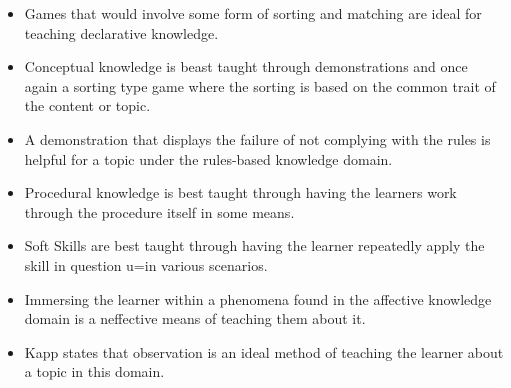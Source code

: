 \documentclass[conference]{IEEEtran}
\begin{document}
\begin{itemize}
\item
Games that would involve some form of sorting and matching are ideal for teaching declarative knowledge\cite{Kapp2012a}.
\item
Conceptual knowledge is beast taught through demonstrations and once again a sorting type game where the sorting is based on the common trait of the content or topic\cite{Kapp2012a}.
\item
A demonstration that displays the failure of not complying with the rules is helpful for a topic under the rules-based knowledge domain\cite{Kapp2012a}.
\item
Procedural knowledge is best taught through having the learners work through the procedure itself in some means\cite{Kapp2012a}.
\item
Soft Skills are best taught through having the learner repeatedly apply the skill in question u=in various scenarios\cite{Kapp2012a}.
\item
Immersing the learner within a phenomena found in the affective knowledge domain is a neffective means of teaching them about it\cite{Kapp2012a}.
\item
Kapp\cite{Kapp2012a} states that observation is an ideal method of teaching the learner about a topic in this domain.
\end{itemize}
\end{document}
